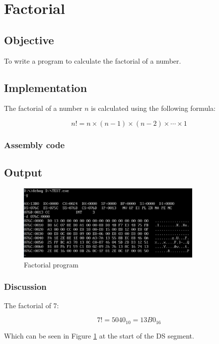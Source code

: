 \section{Factorial}

\subsection{Objective}

To write a program to calculate the factorial of a number.

\subsection{Implementation}

The factorial of a number $n$ is calculated using the following formula:

\begin{equation}
    n! = n \times (n-1) \times (n-2) \times \cdots \times 1
\end{equation}

\subsubsection{Assembly code}


\subsection{Output}

\begin{figure}[ht]
    \centering
    \includegraphics[width=0.8\textwidth]{./res/practicals/fact.png}
    \caption{Factorial program}
    \label{fig:fact}
\end{figure}

\subsubsection{Discussion}

The factorial of 7:

\begin{equation}
    7! = 5040_{10} = 13B0_{16}
\end{equation}

Which can be seen in Figure \ref{fig:fact} at the start of the DS segment.